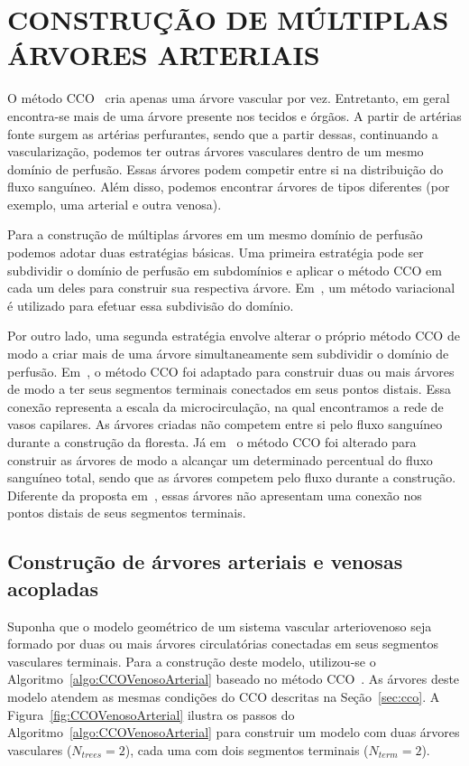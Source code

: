 \section{CONSTRUÇÃO DE MÚLTIPLAS ÁRVORES ARTERIAIS}\label{sec:construcao-de-multiplas-arvores}

O método CCO~\cite{Karch1999,Schreiner1993b} cria apenas uma árvore vascular por vez.
Entretanto, em geral encontra-se mais de uma árvore presente nos tecidos e órgãos. 
A partir de artérias fonte surgem as artérias perfurantes, sendo que a partir dessas,
continuando a vascularização, podemos ter outras árvores vasculares dentro de um 
mesmo domínio de perfusão. Essas árvores podem competir entre si na distribuição do fluxo sanguíneo.
Além disso, podemos encontrar árvores de tipos diferentes (por exemplo, 
uma arterial e outra venosa).

Para a construção de múltiplas árvores em um mesmo domínio de perfusão 
podemos adotar duas estratégias básicas. Uma primeira estratégia pode ser 
subdividir o domínio de perfusão em subdomínios e aplicar o método CCO 
em cada um deles para construir sua respectiva árvore.
Em~\cite{Blanco2013}, um método variacional é utilizado para efetuar essa subdivisão
do domínio.

Por outro lado, uma segunda estratégia envolve alterar o próprio método
CCO de modo a criar mais de uma árvore simultaneamente sem subdividir o domínio de
perfusão. Em~\cite{Queiroz2018}, o método CCO foi adaptado para construir
duas ou mais árvores de modo a ter seus segmentos terminais conectados em 
seus pontos distais. Essa conexão representa a escala da microcirculação, na qual encontramos a 
rede de vasos capilares. As árvores criadas não competem entre si pelo fluxo
sanguíneo durante a construção da floresta. 
Já em~\cite{Jaquet2019} o método CCO foi alterado para construir as árvores 
de modo a alcançar um determinado percentual do fluxo sanguíneo total, sendo que as árvores
competem pelo fluxo durante a construção. Diferente da proposta em~\cite{Queiroz2018}, 
essas árvores não apresentam uma conexão nos pontos distais de seus segmentos terminais.

\subsection{Construção de árvores arteriais e venosas acopladas}\label{subsec:arvores-arterial-venosa}

Suponha que o modelo geométrico de um sistema vascular arteriovenoso seja formado por 
duas ou mais árvores circulatórias conectadas em seus segmentos vasculares terminais. Para a construção 
deste modelo, utilizou-se o Algoritmo~\ref{algo:CCOVenosoArterial} baseado no método CCO~\cite{Queiroz2018}.
As árvores deste modelo atendem as mesmas condições do CCO descritas na Seção~\ref{sec:cco}. A 
Figura~\ref{fig:CCOVenosoArterial} ilustra os passos do Algoritmo~\ref{algo:CCOVenosoArterial} 
para construir um modelo com duas árvores vasculares ($N_{trees} = 2$), cada uma com 
dois segmentos terminais ($N_{term} = 2$).

